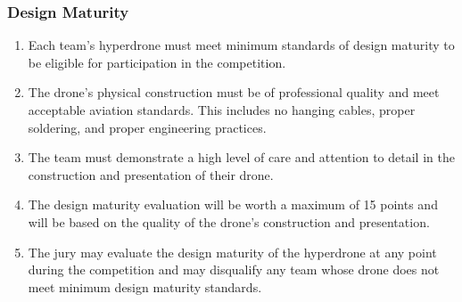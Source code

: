     \subsubsection{Design Maturity}
    \begin{enumerate}
    \item Each team's hyperdrone must meet minimum standards of design maturity to be eligible for participation in the competition.
    \item The drone's physical construction must be of professional quality and meet acceptable aviation standards. This includes no hanging cables, proper soldering, and proper engineering practices.
    \item The team must demonstrate a high level of care and attention to detail in the construction and presentation of their drone.
    \item The design maturity evaluation will be worth a maximum of 15 points and will be based on the quality of the drone's construction and presentation.
    \item The jury may evaluate the design maturity of the hyperdrone at any point during the competition and may disqualify any team whose drone does not meet minimum design maturity standards.
    \end{enumerate}
    
    
    
    
